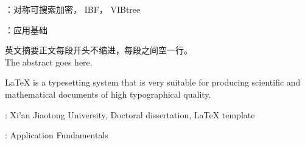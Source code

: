 

\vspace{\baselineskip}
：对称可搜索加密， IBF， VIBtree

\vspace{\baselineskip}
：应用基础

\clearpage


\noindent 英文摘要正文每段开头不缩进，每段之间空一行。\\

\noindent The abstract goes here. \newline

\noindent \LaTeX{} is a typesetting system that is very suitable for producing scientific and mathematical documents of high typographical quality.


\vspace{\baselineskip}
: Xi'an Jiaotong University, Doctoral dissertation, \LaTeX{} template

\vspace{\baselineskip}
: Application Fundamentals

\clearpage
